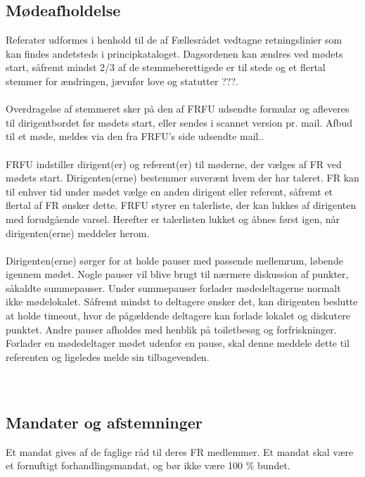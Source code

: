 \subsection{Mødeafholdelse}
Referater udformes i henhold til de af Fællesrådet vedtagne retningslinier som kan findes andetsteds i principkataloget.
Dagsordenen kan ændres ved mødets start, såfremt mindst 2/3 af de stemmeberettigede er til stede og et flertal stemmer
for ændringen, jævnfør love og statutter ???.
\\
\\
Overdragelse af stemmeret sker på den af FRFU udsendte formular og afleveres til dirigentbordet før mødets start, eller sendes i scannet version pr. mail. Afbud til et møde, meldes via den fra FRFU’s side udsendte mail..
\\
\\
FRFU indstiller dirigent(er) og referent(er) til møderne, der vælges af FR ved mødets start. Dirigenten(erne) bestemmer
suverænt hvem der har taleret. FR kan til enhver tid under mødet vælge en anden dirigent eller referent, såfremt et
flertal af FR ønsker dette. FRFU styrer en talerliste, der kan lukkes af dirigenten med forudgående varsel. Herefter er
talerlisten lukket og åbnes først igen, når dirigenten(erne) meddeler herom.
\\
\\
Dirigenten(erne) sørger for at holde pauser med passende mellemrum, løbende igennem mødet. Nogle pauser vil blive
brugt til nærmere diskussion af punkter, såkaldte summepauser. Under summepauser forlader mødedeltagerne normalt
ikke mødelokalet. Såfremt mindst to deltagere ønsker det, kan dirigenten beslutte at holde timeout, hvor de pågældende
deltagere kan forlade lokalet og diskutere punktet. Andre pauser afholdes med henblik på toiletbesøg og forfriskninger.
Forlader en mødedeltager mødet udenfor en pause, skal denne meddele dette til referenten og ligeledes melde sin
tilbagevenden.
\\
\\
\\

\subsection{Mandater og afstemninger}
Et mandat gives af de faglige råd til deres FR medlemmer. Et mandat skal være et fornuftigt forhandlingsmandat, og bør
ikke være 100 \% bundet.\\

